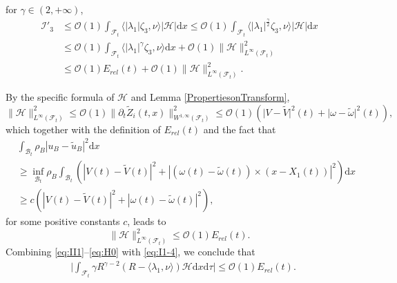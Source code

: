 \documentclass[11pt,twoside,reqno]{amsart}
\numberwithin{equation}{section}
\numberwithin{figure}{section}
\newcommand{\qnt}[1]{\left(#1\right)}
\begin{document}
for $\gamma\in (2,+\infty)$, 
\begin{equation}\label{eq:II4}
    \begin{aligned}
       \mathcal{I}'_3&\leq\mathcal{O}(1)\int_{\mathcal{F}_t}\langle|\lambda_1|\zeta_3,\nu\rangle\big|\mathcal{H}\big|\mathrm{d}x\leq \mathcal{O}(1)\int_{\mathcal{F}_t}\langle|\lambda_1|^{\frac{\gamma}{2}}\zeta_3,\nu\rangle\big|\mathcal{H}\big|\mathrm{d}x\\&\leq \mathcal{O}(1)\int_{\mathcal{F}_t}\langle|\lambda_1|^{\gamma}\zeta_3,\nu\rangle\mathrm{d}x+\mathcal{O}(1)\|\mathcal{H}\|^2_{L^\infty(\mathcal{F}_t)}\\&\leq \mathcal{O}(1)E_{rel}(t)+\mathcal{O}(1)\|\mathcal{H}\|^2_{L^\infty(\mathcal{F}_t)}.
    \end{aligned}
\end{equation}

By the specific formula of $\mathcal{H}$ and Lemma \ref{PropertiesonTransform},
\begin{equation}
    \|\mathcal{H}\|^2_{L^{\infty}(\mathcal{F}_t)}\leq\mathcal{O}(1)\|\partial_t\tilde{Z}_i(t,x)\|^2_{W^{1,\infty}(\mathcal{F}_t)}\leq\mathcal{O}(1)(\big|V-\tilde{V}\big|^2(t)+\big|\omega-\tilde{\omega}\big|^2(t)),
\end{equation}
which together with the definition of $E_{rel}(t)$ and the fact that 
\begin{equation}
   \begin{aligned}
       & \int_{\mathcal{B}_t}\rho_B|u_B-\tilde{u}_B|^2\mathrm{d}x\\&\ge\inf_{\mathcal{B}_t}\rho_B\int_{\mathcal{B}_t}\qnt{|V(t)-\tilde{V}(t)|^2+|(\omega(t)-\tilde{\omega}(t))\times(x-X_1(t))|^2}\mathrm{d}x\\&\ge c \qnt{|V(t)-\tilde{V}(t)|^2+|\omega(t)-\tilde{\omega}(t)|^2},
   \end{aligned}
\end{equation}
for some positive constants $c$, leads to
\begin{equation}\label{eq:H0}
    \|\mathcal{H}\|_{L^\infty(\mathcal{F}_t)}^2\leq \mathcal{O}(1)E_{rel}(t). 
\end{equation}
Combining \eqref{eq:II1}–\eqref{eq:H0} with \eqref{eq:I1-4}, we conclude that
\begin{equation}\label{eq:Finalstep1}
    \begin{aligned}
        &\big|\int_{\mathcal{F}_t}\gamma R^{\gamma-2}(R-\langle\lambda_1,\nu\rangle)\mathcal{H}\mathrm{d}x\mathrm{d}\tau\big|\leq \mathcal{O}(1)E_{rel}(t).
    \end{aligned}
\end{equation}
\end{document}
